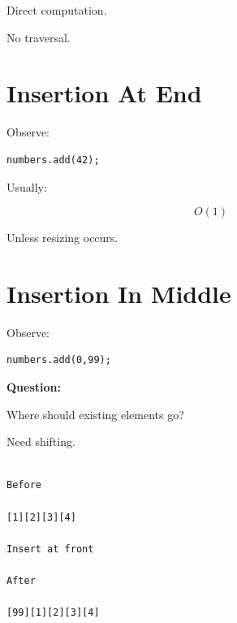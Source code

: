 \documentclass[11pt,a4paper]{book}
\begin{document}

Direct computation.


No traversal.


\section{Insertion At End}

Observe:

\begin{verbatim} 
numbers.add(42);
\end{verbatim}


Usually:

\[
O(1)
\]


Unless resizing occurs.


\section{Insertion In Middle}

Observe:

\begin{verbatim} 
numbers.add(0,99);
\end{verbatim}


\textbf{\textbf{Question:}}

Where should existing elements go?


Need shifting.


\begin{verbatim}

Before

[1][2][3][4]

Insert at front

After

[99][1][2][3][4]

\end{verbatim}
\end{document}
